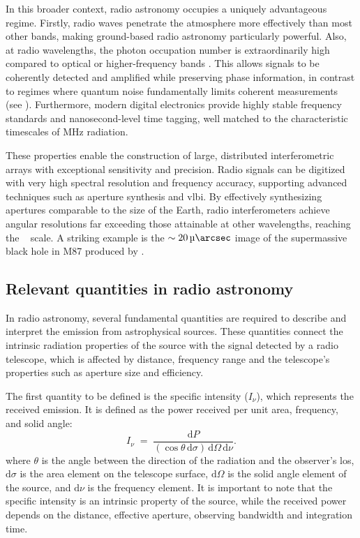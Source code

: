 In this broader context, radio astronomy occupies a uniquely advantageous regime. Firstly, radio waves penetrate the atmosphere more effectively than most other bands, making ground-based radio astronomy particularly powerful. Also, at radio wavelengths, the photon occupation number is extraordinarily high compared to optical or higher-frequency bands \citep{Radhakrishnan1999}. This allows signals to be coherently detected and amplified while preserving phase information, in contrast to regimes where quantum noise fundamentally limits coherent measurements (see \citealt{RevModPhys.82.1155}). Furthermore, modern digital electronics provide highly stable frequency standards and nanosecond-level time tagging, well matched to the characteristic timescales of \si{\mega\hertz} radiation.

These properties enable the construction of large, distributed interferometric arrays with exceptional sensitivity and precision. Radio signals can be digitized with very high spectral resolution and frequency accuracy, supporting advanced techniques such as aperture synthesis and \gls{vlbi}. By effectively synthesizing apertures comparable to the size of the Earth, radio interferometers achieve angular resolutions far exceeding those attainable at other wavelengths, reaching the \si{\micro\arcsec} scale. A striking example is the $\sim\SI{20}{\micro\arcsec}$ image of the supermassive black hole in M87 produced by \citet{Akiyama_2019}.

\subsection{Relevant quantities in radio astronomy}
In radio astronomy, several fundamental quantities are required to describe and interpret the emission from astrophysical sources. These quantities connect the intrinsic radiation properties of the source with the signal detected by a radio telescope, which is affected by distance, frequency range and the telescope's properties such as aperture size and efficiency.

The first quantity to be defined is the specific intensity ($I_\nu$), which represents the received emission. It is defined as the power received per unit area, frequency, and solid angle:
\begin{equation}
	I_\nu \;=\; \frac{\mathrm{d}P}{ (\cos\theta \, \mathrm{d}\sigma) \, \mathrm{d}\Omega \, \mathrm{d}\nu}.
\end{equation}
where $\theta$ is the angle between the direction of the radiation and the observer's \gls{los}, $\mathrm{d}\sigma$ is the area element on the telescope surface, $\mathrm{d}\Omega$ is the solid angle element of the source, and $\mathrm{d}\nu$ is the frequency element. It is important to note that the specific intensity is an intrinsic property of the source, while the received power depends on the distance, effective aperture, observing bandwidth and integration time.



